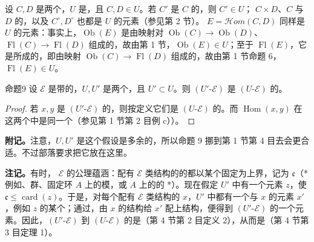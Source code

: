 设 $C,D$ 是两个，$U$ 是，且 $C,D\in U$。若 $C'$ 是 $C$ 的，则 $C'\in U$； $C\times D$、$C$ 与 $D$ 的，以及 $C^\circ,D^\circ$ 也都是 $U$ 的元素（参见第 2 节）。 $E=\mathscr{H}\!om(C,D)$ 同样是 $U$ 的元素：事实上，$\operatorname{Ob}(E)$ 是由映射对 $\operatorname{Ob}(C)\to\operatorname{Ob}(D)$、$\operatorname{Fl}(C)\to\operatorname{Fl}(D)$ 组成的，故由第 1 节，$\operatorname{Ob}(E)\in U$；至于 $\operatorname{Fl}(E)$，它是所成的，即由映射 $\operatorname{Ob}(C)\to\operatorname{Fl}(D)$ 组成的，故由第 1 节命题 6，$\operatorname{Fl}(E)\in U$。

\begin{SGAresult}{命题}{9}
设 $\mathscr E$ 是带的，$U,U'$ 是两个，且 $U'\subset U$。则 $(U'\text{-}\mathscr E)$ 是 $(U\text{-}\mathscr E)$ 的。
\end{SGAresult}
\begin{proof}
若 $x,y$ 是 $(U'\text{-}\mathscr E)$ 的，则按定义它们是 $(U\text{-}\mathscr E)$ 的。而 $\operatorname{Hom}(x,y)$ 在这两个中是同一个（参见第 1 节第 2 目例 c））。
\end{proof}
\textbf{附记。}注意，$U,U'$ 是这个假设是多余的，所以命题 9 挪到第 1 节第 4 目去会更合适。不过部落要求把它放在这里。

\textbf{注记。}有时， $\mathscr E$ 的公理蕴涵：配有 $\mathscr E$ 类结构的的都以某个固定为上界，记为 $\mathfrak{c}$（* 例如、群、固定环 $A$ 上的模，或 $A$ 上的的 *）。现在假定 $U'$ 中有一个元素 $z$，使 $\mathfrak{c}\leq\operatorname{card}(z)$。于是，对每个配有 $\mathscr E$ 类结构的 $x$，$U'$ 中都有一个与 $x$ 的元素 $x'$，例如 $z$ 的某个；通过，由 $x$ 的结构给 $x'$ 配上结构，便得到 $(U'\text{-}\mathscr E)$ 的一个元素。因此，$(U'\text{-}\mathscr E)$ 到 $(U\text{-}\mathscr E)$ 的是（第 4 节第 2 目定义 2），从而是（第 4 节第 3 目定理 1）。

